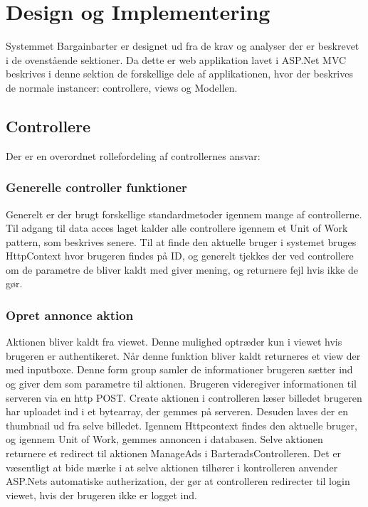 \chapter{Design og Implementering}
Systemmet Bargainbarter er designet ud fra de krav og analyser der er beskrevet i de ovenstående sektioner. Da dette er web applikation lavet i ASP.Net MVC beskrives i denne sektion de forskellige dele af applikationen, hvor der beskrives de normale instancer: controllere, views og Modellen. 


\section{Controllere}
Der er en overordnet rollefordeling af controllernes ansvar: 



\subsection{Generelle controller funktioner}

Generelt er der brugt forskellige standardmetoder igennem mange af controllerne. Til adgang til data acces laget kalder alle controllere igennem et Unit of Work pattern, som beskrives senere. Til at finde den aktuelle bruger i systemet bruges HttpContext hvor brugeren findes på ID, og generelt tjekkes der ved controllere om de parametre de bliver kaldt med giver mening, og returnere fejl hvis ikke de gør.  

\subsection{Opret annonce aktion}

Aktionen bliver kaldt fra viewet. Denne mulighed optræder kun i viewet hvis brugeren er authentikeret. Når denne funktion bliver kaldt returneres et view der med inputboxe. Denne form group samler de informationer brugeren sætter ind og giver dem som parametre til aktionen. Brugeren videregiver informationen til serveren via en http POST. Create aktionen i controlleren læser billedet brugeren har uploadet ind i et bytearray, der gemmes på serveren. Desuden laves der en thumbnail ud fra selve billedet. Igennem Httpcontext findes den aktuelle bruger, og igennem Unit of Work, gemmes annoncen i databasen. Selve aktionen returnere et redirect til aktionen ManageAds i BarteradsControlleren. Det er væsentligt at bide mærke i at selve aktionen tilhører i kontrolleren anvender ASP.Nets automatiske autherization, der gør at controlleren redirecter til login viewet, hvis der brugeren ikke er logget ind.




